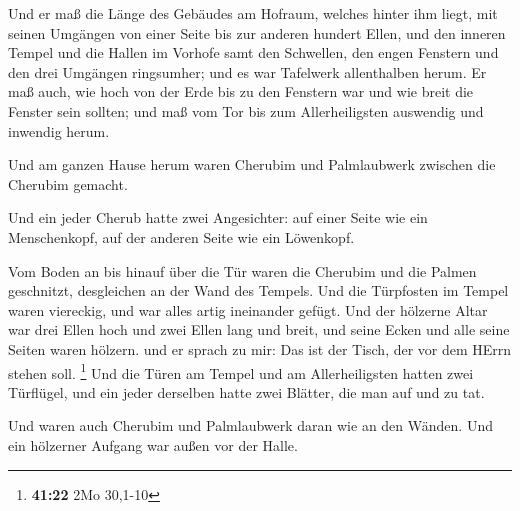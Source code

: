  Und er maß die Länge des Gebäudes am Hofraum, welches
hinter ihm liegt, mit seinen Umgängen von einer Seite bis zur anderen
hundert Ellen, und den inneren Tempel und die Hallen im Vorhofe
 samt den Schwellen, den engen Fenstern und den drei
Umgängen ringsumher; und es war Tafelwerk allenthalben herum.
 Er maß auch, wie hoch von der Erde bis zu den Fenstern war
und wie breit die Fenster sein sollten; und maß vom Tor bis zum
Allerheiligsten auswendig und inwendig herum.

 Und am ganzen Hause herum waren Cherubim und Palmlaubwerk
zwischen die Cherubim gemacht.

 Und ein jeder Cherub hatte zwei Angesichter: auf einer
Seite wie ein Menschenkopf, auf der anderen Seite wie ein Löwenkopf.

 Vom Boden an bis hinauf über die Tür waren die Cherubim
und die Palmen geschnitzt, desgleichen an der Wand des Tempels.
 Und die Türpfosten im Tempel waren viereckig, und war
alles artig ineinander gefügt.  Und der hölzerne Altar war
drei Ellen hoch und zwei Ellen lang und breit, und seine Ecken und alle
seine Seiten waren hölzern. und er sprach zu mir: Das ist der Tisch, der
vor dem HErrn stehen soll. \footnote{\textbf{41:22} 2Mo 30,1-10}
 Und die Türen am Tempel und am Allerheiligsten
 hatten zwei Türflügel, und ein jeder derselben hatte zwei
Blätter, die man auf und zu tat.

 Und waren auch Cherubim und Palmlaubwerk daran wie an den
Wänden. Und ein hölzerner Aufgang war außen vor der Halle.

